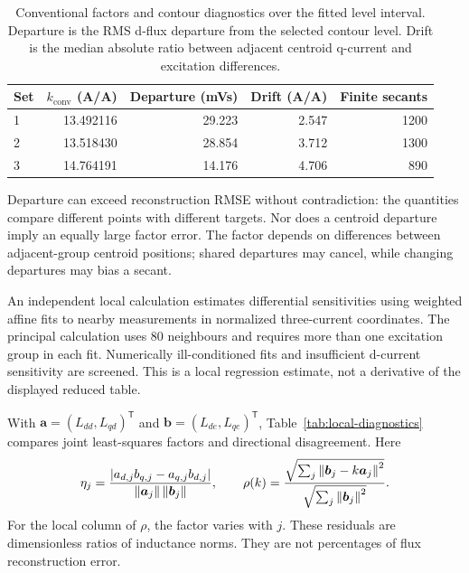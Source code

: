\begin{table}[htbp]
\centering\small
\caption{Conventional factors and contour diagnostics over the fitted level interval. Departure is the RMS d-flux departure from the selected contour level. Drift is the median absolute ratio between adjacent centroid q-current and excitation differences.}
\label{tab:contour-diagnostics}
\begin{tabular}{lrrrr}
\toprule
Set & $k_{\mathrm{conv}}$ (A/A) & Departure (mVs) & Drift (A/A) & Finite secants\\
\midrule
1 & 13.492116 & 29.223 & 2.547 & 1200\\
2 & 13.518430 & 28.854 & 3.712 & 1300\\
3 & 14.764191 & 14.176 & 4.706 & 890\\
\bottomrule
\end{tabular}
\end{table}

Departure can exceed reconstruction RMSE without contradiction: the quantities compare different points with different targets. Nor does a centroid departure imply an equally large factor error. The factor depends on differences between adjacent-group centroid positions; shared departures may cancel, while changing departures may bias a secant.

An independent local calculation estimates differential sensitivities using weighted affine fits to nearby measurements in normalized three-current coordinates. The principal calculation uses 80 neighbours and requires more than one excitation group in each fit. Numerically ill-conditioned fits and insufficient d-current sensitivity are screened. This is a local regression estimate, not a derivative of the displayed reduced table.

With $\bm a=(L_{dd},L_{qd})^\mathsf T$ and $\bm b=(L_{de},L_{qe})^\mathsf T$, Table~\ref{tab:local-diagnostics} compares joint least-squares factors and directional disagreement. Here
\begin{equation}
\eta_j=\frac{|a_{d,j}b_{q,j}-a_{q,j}b_{d,j}|}{\left\lVert\bm a_j\right\rVert\left\lVert\bm b_j\right\rVert},
\qquad
\rho(k)=\frac{\sqrt{\sum_j\left\lVert\bm b_j-k\bm a_j\right\rVert^2}}
{\sqrt{\sum_j\left\lVert\bm b_j\right\rVert^2}}.
\end{equation}
For the local column of $\rho$, the factor varies with $j$. These residuals are dimensionless ratios of inductance norms. They are not percentages of flux reconstruction error.

